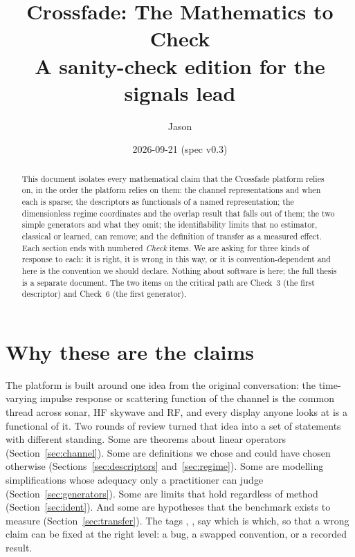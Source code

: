 \documentclass[11pt,a4paper]{article}
\title{Crossfade: The Mathematics to Check\\[4pt]\large A sanity-check edition for the signals lead}
\author{Jason}
\date{2026-09-21 \quad (spec v0.3)}
\begin{document}
\maketitle

\begin{abstract}
\noindent This document isolates every mathematical claim that the Crossfade platform relies on, in the order the platform relies on them: the channel representations and when each is sparse; the descriptors as functionals of a named representation; the dimensionless regime coordinates and the overlap result that falls out of them; the two simple generators and what they omit; the identifiability limits that no estimator, classical or learned, can remove; and the definition of transfer as a measured effect. Each section ends with numbered \emph{Check} items. We are asking for three kinds of response to each: it is right, it is wrong in this way, or it is convention-dependent and here is the convention we should declare. Nothing about software is here; the full thesis is a separate document. The two items on the critical path are Check~3 (the first descriptor) and Check~6 (the first generator).
\end{abstract}

\tableofcontents
\bigskip

\section*{Why these are the claims}

The platform is built around one idea from the original conversation: the time-varying impulse response or scattering function of the channel is the common thread across sonar, HF skywave and RF, and every display anyone looks at is a functional of it. Two rounds of review turned that idea into a set of statements with different standing. Some are theorems about linear operators (Section~\ref{sec:channel}). Some are definitions we chose and could have chosen otherwise (Sections~\ref{sec:descriptors} and~\ref{sec:regime}). Some are modelling simplifications whose adequacy only a practitioner can judge (Section~\ref{sec:generators}). Some are limits that hold regardless of method (Section~\ref{sec:ident}). And some are hypotheses that the benchmark exists to measure (Section~\ref{sec:transfer}). The tags \tagG{}, \tagP{}, \tagH{} say which is which, so that a wrong claim can be fixed at the right level: a bug, a swapped convention, or a recorded result.


\end{document}
